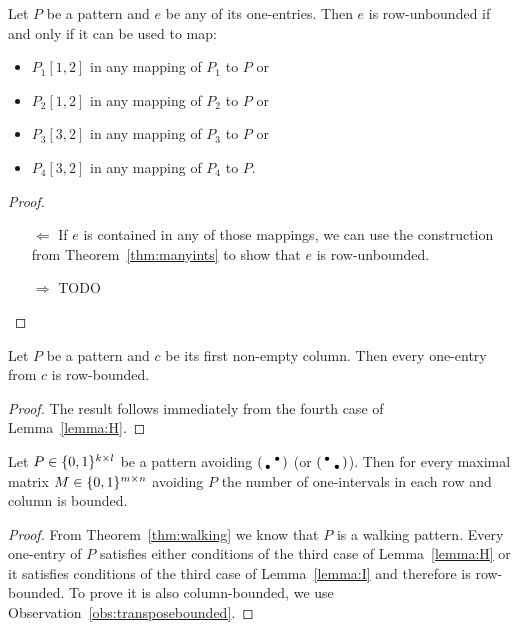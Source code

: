 \begin{thm}
Let $P$ be a pattern and $e$ be any of its one-entries. Then $e$ is row-unbounded if and only if it can be used to map:
\begin{itemize}
\item $P_1[1,2]$ in any mapping of $P_1$ to $P$ or
\item $P_2[1,2]$ in any mapping of $P_2$ to $P$ or
\item $P_3[3,2]$ in any mapping of $P_3$ to $P$ or
\item $P_4[3,2]$ in any mapping of $P_4$ to $P$.
\end{itemize}
\end{thm}
\begin{proof}
\begin{itemize}
\item[$\Leftarrow$] If $e$ is contained in any of those mappings, we can use the construction from Theorem~\ref{thm:manyints} to show that $e$ is row-unbounded.
\item[$\Rightarrow$] TODO
\end{itemize}
\end{proof}

\begin{lemma}
\label{lemma:First}
Let $P$ be a pattern and $c$ be its first non-empty column. Then every one-entry from $c$ is row-bounded.
\end{lemma}
\begin{proof}
The result follows immediately from the fourth case of Lemma~\ref{lemma:H}.
\end{proof}

\begin{lemma}
\label{lemma:walkpat}
Let $P\in\{0,1\}^{k\times l}$ be a pattern avoiding $\left(\begin{smallmatrix} &\bullet\\\bullet& \end{smallmatrix}\right)$ (or $\left(\begin{smallmatrix}\bullet& \\ &\bullet\end{smallmatrix}\right)$). Then for every maximal matrix $M\in\{0,1\}^{m\times n}$ avoiding $P$ the number of one-intervals in each row and column is bounded.
\end{lemma}
\begin{proof}
From Theorem~\ref{thm:walking} we know that $P$ is a walking pattern. Every one-entry of $P$ satisfies either conditions of the third case of Lemma~\ref{lemma:H} or it satisfies conditions of the third case of Lemma~\ref{lemma:I} and therefore is row-bounded. To prove it is also column-bounded, we use Observation~\ref{obs:transposebounded}.
\end{proof}

